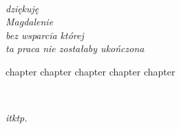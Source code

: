 \documentclass[
  a4paper,
  twoside,
  justified,
  nobib,
  nofonts,
  marginals=raggedright,
]{tufte-book}
\begin{document}
\frontmatter
\maketitle

\cleardoublepage
\thispagestyle{empty}
~\vfill
\vfill
\begin{fullwidth}
\raggedleft\noindent\fontsize{16}{26}\selectfont\itshape
\nohyphenation
dziękuję \\
Magdalenie \\
bez wsparcia której \\
ta praca nie zostałaby ukończona
\end{fullwidth}
\vfill

\tableofcontents



\mainmatter

{chapter}
{chapter}
{chapter}
{chapter}
{chapter}

\backmatter


\cleardoublepage%
\thispagestyle{empty}%
~\vfill%
\vfill%
{%
  \begin{fullwidth}%
    \raggedleft\noindent\fontsize{16}{26}\selectfont\itshape%
    itktp.\hspace*{0.2\textwidth}\par%
  \end{fullwidth}%
}%
\vfill%
\end{document}
